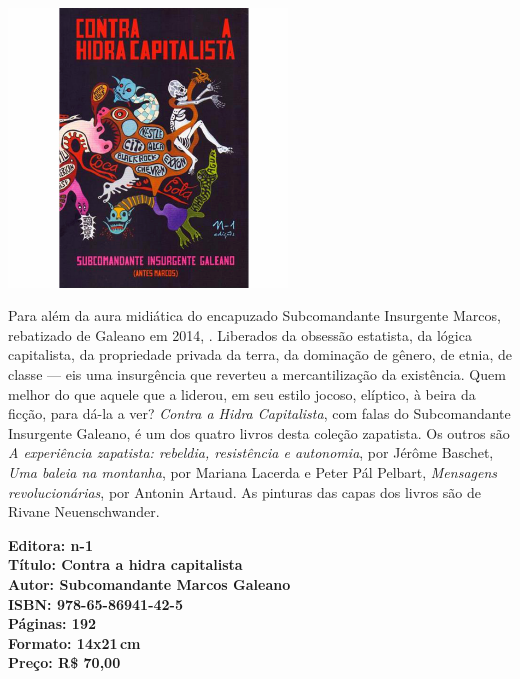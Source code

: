 \pagebreak

\pagebreak

\begin{center}
\hspace*{-3.6cm}
\hspace*{3.1cm}\includegraphics[width=74mm]{./CAPAS/hidra.jpg}
\end{center}

\hspace*{-7cm}\hrulefill\hspace*{-7cm}

\medskip

\noindent{}Para além da aura midiática do encapuzado Subcomandante Insurgente Marcos, rebatizado de Galeano em 2014, . Liberados da obsessão estatista, da lógica capitalista, da propriedade privada da terra, da dominação de gênero, de etnia, de classe --- eis uma insurgência que reverteu a mercantilização da existência. Quem melhor do que aquele que a liderou, em seu estilo jocoso, elíptico, à beira da ficção, para dá-la a ver? \textit{Contra a Hidra Capitalista}, com falas do Subcomandante Insurgente Galeano, é um dos quatro livros desta coleção zapatista. Os outros são \textit{A experiência zapatista: rebeldia, resistência e autonomia}, por Jérôme Baschet, \textit{Uma baleia na montanha}, por Mariana Lacerda e Peter Pál Pelbart, \textit{Mensagens revolucionárias}, por Antonin Artaud. As pinturas das capas dos livros são de Rivane Neuenschwander.

\vfill

\hspace*{-.4cm}\begin{minipage}[c]{.5\linewidth}
\small\textbf{
\hspace*{-.1cm}Editora: n-1\\
Título: Contra a hidra capitalista\\
Autor: Subcomandante Marcos Galeano\\ 
ISBN: 978-65-86941-42-5\\
Páginas: 192\\
Formato: 14x21\,cm\\
Preço: R\$ 70,00\\
}
\end{minipage}

